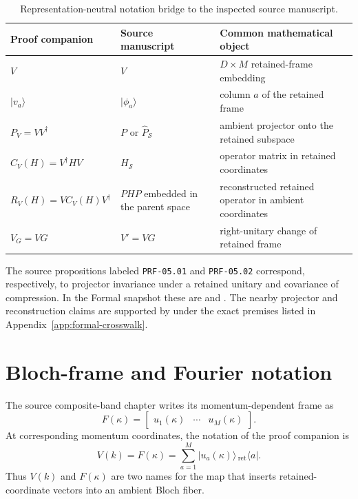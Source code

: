 \begin{table}[ht]
\centering
\small
\begin{tabularx}{\textwidth}{@{}l Y Y@{}}
\toprule
Proof companion & Source manuscript & Common mathematical object \\
\midrule
$V$
  & $V$
  & $D\times M$ retained-frame embedding \\
$|v_a\rangle$
  & $|\phi_a\rangle$
  & column $a$ of the retained frame \\
$P_V=VV^\dagger$
  & $P$ or $\widehat P_{\mathcal S}$
  & ambient projector onto the retained subspace \\
$C_V(H)=V^\dagger HV$
  & $H_{\mathcal S}$
  & operator matrix in retained coordinates \\
$R_V(H)=VC_V(H)V^\dagger$
  & $PHP$ embedded in the parent space
  & reconstructed retained operator in ambient coordinates \\
$V_G=VG$
  & $V'=VG$
  & right-unitary change of retained frame \\
\bottomrule
\end{tabularx}
\caption{Representation-neutral notation bridge to the inspected source manuscript.}
\label{tab:finite-manuscript-notation-bridge}
\end{table}

The source propositions labeled \texttt{PRF-05.01} and \texttt{PRF-05.02} correspond,
respectively, to projector invariance under a retained unitary and covariance of
compression. In the Formal snapshot these are
 and . The nearby projector and
reconstruction claims are supported by  under the exact
premises listed in Appendix~\ref{app:formal-crosswalk}.

\section{Bloch-frame and Fourier notation}

The source composite-band chapter writes its momentum-dependent frame as
\[
  F(\kappa)=\begin{bmatrix}u_1(\kappa)&\cdots&u_M(\kappa)\end{bmatrix}.
\]
At corresponding momentum coordinates, the notation of the proof companion is
\[
  V(k)=F(\kappa)
  =\sum_{a=1}^M |u_a(\kappa)\rangle\,{}_{\mathrm{ret}}\!\langle a|.
\]
Thus $V(k)$ and $F(\kappa)$ are two names for the map that inserts retained-coordinate
vectors into an ambient Bloch fiber.

